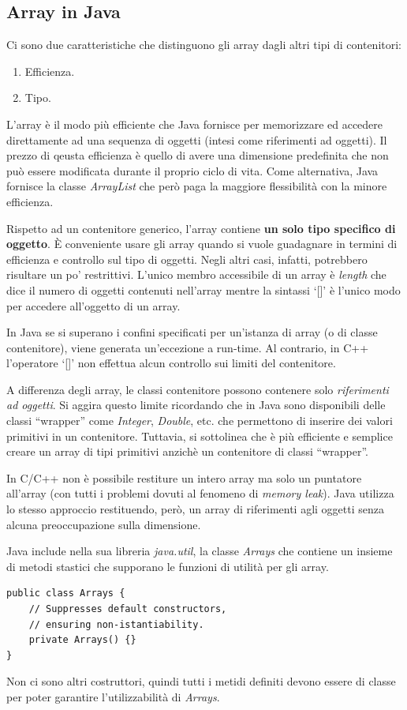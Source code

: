 \documentclass[12pt]{report}
\begin{document}
\subsection{Array in Java}
Ci sono due caratteristiche che distinguono gli array dagli altri tipi di contenitori:
\begin{enumerate}
	\item Efficienza.
	\item Tipo.
\end{enumerate}
L'array è il modo più efficiente che Java fornisce per memorizzare ed accedere direttamente ad una sequenza di oggetti (intesi come riferimenti ad oggetti). Il prezzo di qeusta efficienza è quello di avere una dimensione predefinita che non può essere modificata durante il proprio ciclo di vita. Come alternativa, Java fornisce la classe \textit{ArrayList} che però paga la maggiore flessibilità con la minore efficienza.

Rispetto ad un contenitore generico, l'array contiene \textbf{un solo tipo specifico di oggetto}. È conveniente usare gli array quando si vuole guadagnare in termini di efficienza e controllo sul tipo di oggetti. Negli altri casi, infatti, potrebbero risultare un po' restrittivi. L'unico membro accessibile di un array è \textit{length} che dice il numero di oggetti contenuti nell'array mentre la sintassi `[]' è l'unico modo per accedere all'oggetto di un array.

In Java se si superano i confini specificati per un'istanza di array (o di classe contenitore), viene generata un'eccezione a run-time. Al contrario, in C++ l'operatore `[]' non effettua alcun controllo sui limiti del contenitore.

A differenza degli array, le classi contenitore possono contenere solo \textit{riferimenti ad oggetti}. Si aggira questo limite ricordando che in Java sono disponibili delle classi ``wrapper'' come \textit{Integer}, \textit{Double}, etc. che permettono di inserire dei valori primitivi in un contenitore. Tuttavia, si sottolinea che è più efficiente e semplice creare un array di tipi primitivi anzichè un contenitore di classi ``wrapper''.

In C/C++ non è possibile restiture un intero array ma solo un puntatore all'array (con tutti i problemi dovuti al fenomeno di \textit{memory leak}). Java utilizza lo stesso approccio restituendo, però, un array di riferimenti agli oggetti senza alcuna preoccupazione sulla dimensione.

Java include nella sua libreria \textit{java.util}, la classe \textit{Arrays} che contiene un insieme di metodi stastici che supporano le funzioni di utilità per gli array.
\begin{lstlisting}[style=javastyle]
public class Arrays {
	// Suppresses default constructors,
	// ensuring non-istantiability.
	private Arrays() {}
}
\end{lstlisting}
Non ci sono altri costruttori, quindi tutti i metidi definiti devono essere di classe per poter garantire l'utilizzabilità di \textit{Arrays}.
\end{document}
